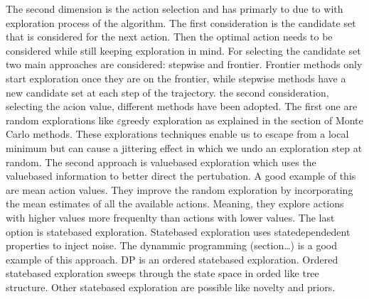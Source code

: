 \documentclass[letterpaper,10pt,english]{jupyterBook}
\begin{document}
\sphinxAtStartPar
The second dimension is the action selection and has primarly to due to with exploration process of the algorithm. The first consideration is the candidate set that is considered for the next action. Then the optimal action needs to be considered while still keeping exploration in mind. For selecting the candidate set two main approaches are considered: step\sphinxhyphen{}wise and frontier. Frontier methods only start exploration once they are on the frontier, while step\sphinxhyphen{}wise methods have a new candidate set at each step of the trajectory. the second consideration, selecting the acion value,  different methods have been adopted. The first one are random explorations like \(\varepsilon\)\sphinxhyphen{}greedy exploration as explained in the section of Monte Carlo methods. These explorations techniques enable us to escape from a local minimum but can cause a jittering effect in which we undo an exploration step at random. The second approach is value\sphinxhyphen{}based exploration which uses the value\sphinxhyphen{}based information to better direct the pertubation. A good example of this are mean action values. They improve the random exploration by incorporating the mean estimates of all the available actions. Meaning, they explore actions with higher values more frequenlty than actions with lower values. The last option is state\sphinxhyphen{}based exploration. State\sphinxhyphen{}based exploration uses state\sphinxhyphen{}dependedent properties to inject noise. The dynammic programming (section…) is a good example of this approach. DP is an ordered state\sphinxhyphen{}based exploration. Ordered state\sphinxhyphen{}based exploration sweeps through the state space in orded like tree structure. Other state\sphinxhyphen{}based exploration are possible like novelty and priors.
\end{document}
